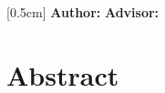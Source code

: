 \clearpage\thispagestyle{empty}
\begin{center}
  {\large\bfseries \thesisTitle}[0.5cm]
  \textbf{Author:} \thesisAuthor\quad
  \textbf{Advisor:} \thesisAdvisor{}
\end{center}
\chapter*{Abstract}
\vspace{1cm}